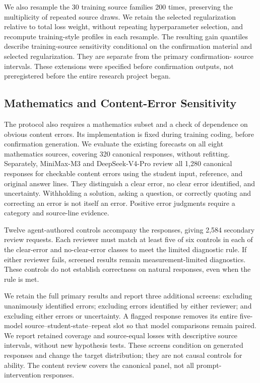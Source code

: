 We also resample the 30 training source families 200 times, preserving the
multiplicity of repeated source draws. We retain the selected regularization
relative to total loss weight, without repeating hyperparameter selection, and
recompute training-style profiles in each resample. The resulting gain quantiles
describe training-source sensitivity conditional on the confirmation material
and selected regularization. They are separate from the primary confirmation-
source intervals. These extensions were specified before confirmation outputs,
not preregistered before the entire research project began.

\subsection{Mathematics and Content-Error Sensitivity}

The protocol also requires a mathematics subset and a check of dependence on
obvious content errors. Its implementation is fixed during training coding,
before confirmation generation. We evaluate the existing forecasts on all eight
mathematics sources, covering 320 canonical responses, without refitting.
Separately, MiniMax-M3 and DeepSeek-V4-Pro review all 1,280 canonical responses
for checkable content errors using the student input, reference, and original
answer lines. They distinguish a clear error, no clear error identified, and
uncertainty. Withholding a solution, asking a question, or correctly quoting
and correcting an error is not itself an error. Positive error judgments
require a category and source-line evidence.

Twelve agent-authored controls accompany the responses, giving 2,584
secondary review requests. Each reviewer must match at least five of six
controls in each of the clear-error and no-clear-error classes to meet the
limited diagnostic rule. If either reviewer fails, screened results remain
measurement-limited diagnostics. These controls do not establish correctness
on natural responses, even when the rule is met.

We retain the full primary results and report three additional screens:
excluding unanimously identified errors; excluding errors identified by either
reviewer; and excluding either errors or uncertainty. A flagged response
removes its entire five-model source--student-state--repeat slot so that model
comparisons remain paired. We report retained coverage and source-equal losses
with descriptive source intervals, without new hypothesis tests. These screens
condition on generated responses and change the target distribution; they are
not causal controls for ability. The content review covers the canonical panel,
not all prompt-intervention responses.

